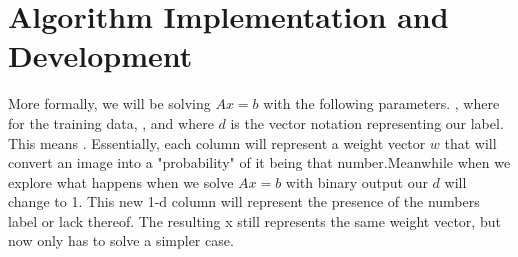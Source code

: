 \documentclass[12pt]{article}
\begin{document}
	\section{Algorithm Implementation and Development}
	More formally, we will be solving $Ax=b$ with the following parameters.  ,  where  for the training data, , and  where $d$ is the vector notation representing our label. This means . Essentially, each column will represent a weight vector $w$ that will convert an image into a "probability" of it being that number.Meanwhile when we explore what happens when we solve $Ax=b$ with binary output our $d$ will change to 1. This new 1-d column will represent the presence of the numbers label or lack thereof. The resulting x still represents the same weight vector, but now only has to solve a simpler case.
	
\end{document}

